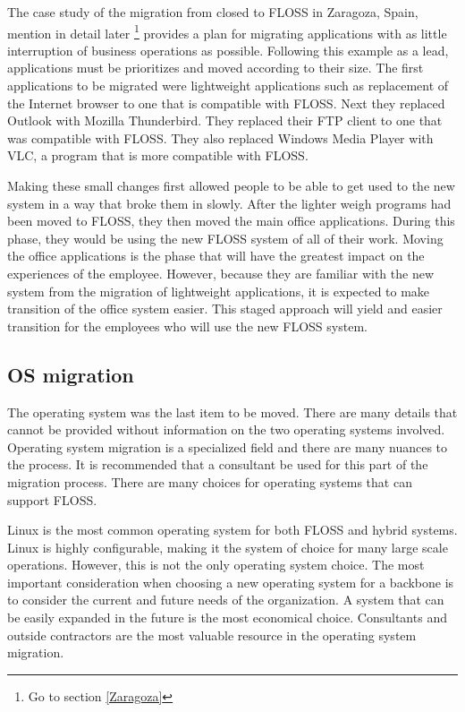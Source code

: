     The case study of the migration from closed to FLOSS in Zaragoza, Spain,   mention in detail later \footnote{Go to section \ref{Zaragoza}} provides a plan for migrating applications with as little interruption of business operations as possible. Following this example as a lead, applications must be prioritizes and moved according to their size.  The first applications to be migrated were lightweight  applications such as replacement of the Internet browser to one that is compatible with FLOSS. Next they replaced Outlook with Mozilla Thunderbird. They replaced their FTP client to one that was compatible with FLOSS. They also replaced Windows Media Player with VLC, a program that is more compatible with FLOSS. 
    
     Making these small changes first allowed people to be able to get used to the new system in a way that broke them in slowly. After the lighter weigh programs had been moved to FLOSS, they then moved the main office applications. During this phase, they would be using the new FLOSS system of all of their work. Moving the office applications is the phase that will have the greatest impact on the experiences of the employee. However, because they are familiar with the new system from the migration of lightweight applications, it is expected to make transition of the office system easier. This staged approach will yield and easier transition for the employees who will use the new FLOSS system.          
  
   \subsection{OS migration}
    \label{opensource_OS} 
    The operating system was the last item to be moved.  There are many details that cannot be provided without information on the two operating systems involved. Operating system migration is a specialized field and there are many nuances to the process. It is recommended that a consultant be used for this part of the migration process. There are many choices for operating systems that can support FLOSS.
    
    Linux is the most common operating system for both FLOSS and hybrid systems. Linux is highly configurable, making it the system of choice for many large scale operations. However, this is not the only operating system choice. The most important consideration when choosing a new operating system for a backbone is to consider the current and future needs of the organization. A system that can be easily expanded in the future is the most economical choice. Consultants and outside contractors are the most valuable resource in the operating system migration. 
    
